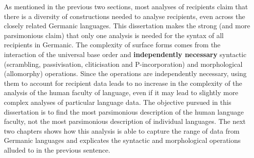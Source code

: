 As mentioned in the previous two sections, most analyses of recipients claim that there is a diversity of constructions needed to analyse recipients, even across the closely related Germanic languages. This dissertation makes the strong (and more parsimonious claim) that only one analysis is needed for the syntax of all recipients in Germanic. The complexity of surface forms comes from the interaction of the universal base order and \textbf{independently necessary} syntactic (scrambling, passivisation, cliticisation and P-incorporation) and morphological (allomorphy) operations. Since the operations are independently necessary, using them to account for recipient data leads to no increase in the complexity of the analysis of the human faculty of language, even if it may lead to slightly more complex analyses of particular language data. The objective pursued in this dissertation is to find the most parsimonious description of the human language faculty, not the most parsimonious description of individual languages. The next two chapters shows how this analysis is able to capture the range of data from Germanic languages and explicates the syntactic and morphological operations alluded to in the previous sentence.

%
